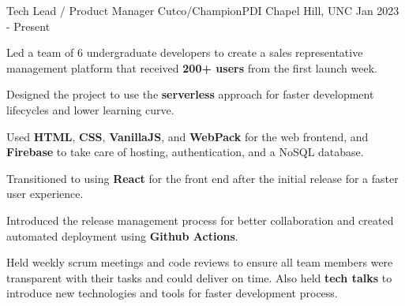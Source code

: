 
\begin{cventries}
  \cventry
    {Tech Lead / Product Manager} %
    {Cutco/ChampionPDI} %
    {Chapel Hill, UNC} %
    {Jan 2023 - Present} %
    {
      \begin{cvitems} %
        \item {Led a team of 6 undergraduate developers to create a sales representative management platform that received \textbf{200+ users} from the first launch week.}
        \item {Designed the project to use the \textbf{serverless} approach for faster development lifecycles and lower learning curve.}
        \item {Used \textbf{HTML}, \textbf{CSS}, \textbf{VanillaJS}, and \textbf{WebPack} for the web frontend, and \textbf{Firebase} to take care of hosting, authentication, and a NoSQL database.}
        \item {Transitioned to using \textbf{React} for the front end after the initial release for a faster user experience.}
        \item {Introduced the release management process for better collaboration and created automated deployment using \textbf{Github Actions}.}
        \item {Held weekly scrum meetings and code reviews to ensure all team members were transparent with their tasks and could deliver on time. Also held \textbf{tech talks} to introduce new technologies and tools for faster development process.}
      \end{cvitems}
    }


\end{cventries}
